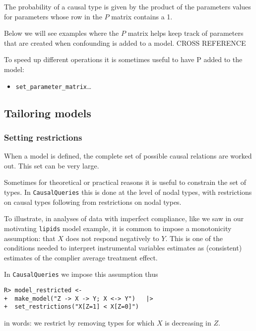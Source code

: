 \documentclass[
  11pt,
  article]{jss}
\providecommand{\tightlist}{%
  \setlength{\itemsep}{0pt}\setlength{\parskip}{0pt}}\usepackage{longtable,booktabs,array}
\begin{document}
The probability of a causal type is given by the product of the
parameters values for parameters whose row in the \(P\) matrix contains
a 1.

Below we will see examples where the \(P\) matrix helps keep track of
parameters that are created when confounding is added to a model. CROSS
REFERENCE

To speed up different operations it is sometimes useful to have P added
to the model:

\begin{itemize}
\tightlist
\item
  \texttt{set\_parameter\_matrix}\ldots{}
\end{itemize}

\hypertarget{tailoring-models}{%
\subsection{Tailoring models}\label{tailoring-models}}

\hypertarget{restrictions}{%
\subsubsection{Setting restrictions}\label{restrictions}}

When a model is defined, the complete set of possible causal relations
are worked out. This set can be very large.

Sometimes for theoretical or practical reasons it is useful to constrain
the set of types. In \texttt{CausalQueries} this is done at the level of
nodal types, with restrictions on causal types following from
restrictions on nodal types.

To illustrate, in analyses of data with imperfect compliance, like we
saw in our motivating \texttt{lipids} model example, it is common to
impose a monotonicity assumption: that \(X\) does not respond negatively
to \(Y\). This is one of the conditions needed to interpret instrumental
variables estimates as (consistent) estimates of the complier average
treatment effect.

In \texttt{CausalQueries} we impose this assumption thus

\begin{verbatim}
R> model_restricted <- 
+  make_model("Z -> X -> Y; X <-> Y")   |> 
+  set_restrictions("X[Z=1] < X[Z=0]")
\end{verbatim}

in words: we restrict by removing types for which \(X\) is decreasing in
\(Z\).
\end{document}
